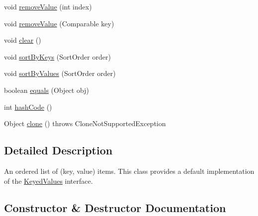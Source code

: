 \begin{DoxyCompactItemize}
\item 
void \mbox{\hyperlink{classorg_1_1jfree_1_1data_1_1_default_keyed_values_a6f3715b266193efd5bb4ded6ccea56c8}{remove\+Value}} (int index)
\item 
void \mbox{\hyperlink{classorg_1_1jfree_1_1data_1_1_default_keyed_values_a163198097e4c516f2bde43502effb43e}{remove\+Value}} (Comparable key)
\item 
void \mbox{\hyperlink{classorg_1_1jfree_1_1data_1_1_default_keyed_values_a475fffdc4d0d06980fa755eb6c0f9c3a}{clear}} ()
\item 
void \mbox{\hyperlink{classorg_1_1jfree_1_1data_1_1_default_keyed_values_af6c058aa3de36978d14dba6d2b40bf65}{sort\+By\+Keys}} (Sort\+Order order)
\item 
void \mbox{\hyperlink{classorg_1_1jfree_1_1data_1_1_default_keyed_values_a8b8d4680b4079d7c191ee9af47db60db}{sort\+By\+Values}} (Sort\+Order order)
\item 
boolean \mbox{\hyperlink{classorg_1_1jfree_1_1data_1_1_default_keyed_values_ac0f4c07bb87728f0365be0624fd3a48d}{equals}} (Object obj)
\item 
int \mbox{\hyperlink{classorg_1_1jfree_1_1data_1_1_default_keyed_values_a2e57ea8300157009409d60db38c7ea02}{hash\+Code}} ()
\item 
Object \mbox{\hyperlink{classorg_1_1jfree_1_1data_1_1_default_keyed_values_a1604f8c1fa18141fdd67ee2e59008248}{clone}} ()  throws Clone\+Not\+Supported\+Exception 
\end{DoxyCompactItemize}


\subsection{Detailed Description}
An ordered list of (key, value) items. This class provides a default implementation of the \mbox{\hyperlink{interfaceorg_1_1jfree_1_1data_1_1_keyed_values}{Keyed\+Values}} interface. 

\subsection{Constructor \& Destructor Documentation}
\mbox{\label{classorg_1_1jfree_1_1data_1_1_default_keyed_values_a8ca19fb8e67e696cf13b1f9d5099a7d9}} 

